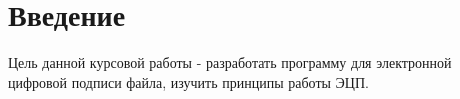 \section*{Введение}

Цель данной курсовой работы - разработать программу для электронной цифровой подписи файла, изучить принципы работы ЭЦП.